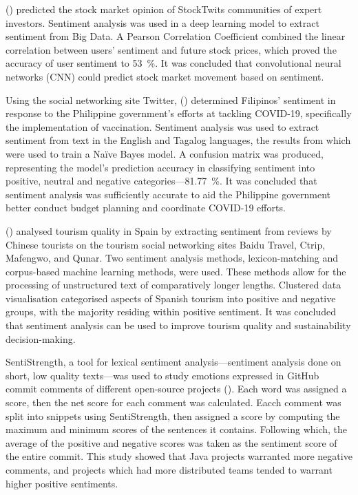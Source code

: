 \documentclass[12pt, a4paper]{pancake-article}
\begin{document}
\citeauthor{stock} (\citeyear{stock}) predicted the stock market opinion of StockTwits communities of expert
investors. Sentiment analysis was used in a deep learning model to extract sentiment from Big Data.
A Pearson Correlation Coefficient combined the linear correlation between users' sentiment and
future stock prices, which proved the accuracy of user sentiment to \qty{53}{\percent}. It was
concluded that convolutional neural networks (CNN) could predict stock market movement based on
sentiment.

Using the social networking site Twitter, \citeauthor{twitter} (\citeyear{twitter}) determined
Filipinos' sentiment in response to the Philippine government's efforts at tackling COVID-19,
specifically the implementation of vaccination. Sentiment analysis was used to extract sentiment
from text in the English and Tagalog languages, the results from which were used to train a Naïve
Bayes model. A confusion matrix was produced, representing the model's prediction accuracy
in classifying sentiment into positive, neutral and negative categories---\qty{81.77}{\percent}.
It was concluded that sentiment analysis was sufficiently accurate to aid the Philippine government
better conduct budget planning and coordinate COVID-19 efforts.

\citeauthor{spain} (\citeyear{spain}) analysed tourism quality in Spain
by extracting sentiment from reviews by Chinese tourists on the tourism
social networking sites Baidu Travel, Ctrip, Mafengwo, and Qunar.
Two sentiment analysis methods, lexicon-matching and corpus-based machine
learning methods, were used. These methods allow for the processing of
unstructured text of comparatively longer lengths. Clustered data
visualisation categorised aspects of Spanish tourism into positive
and negative groups, with the majority residing within positive sentiment.
It was concluded that sentiment analysis can be used to improve tourism
quality and sustainability decision-making.

SentiStrength, a tool for lexical sentiment analysis---sentiment analysis
done on short, low quality texts---was used to study emotions expressed
in GitHub commit comments of different open-source projects (\cite{github}).
Each word was assigned a score, then the net score for each comment was calculated.
Eacch comment was split into snippets using SentiStrength, then assigned a score by
computing the maximum and minimum scores of the sentences it contains.
Following which, the average of the positive and negative scores was taken as the
sentiment score of the entire commit. This study showed that Java projects warranted
more negative comments, and projects which had more distributed teams tended
to warrant higher positive sentiments.
\end{document}
